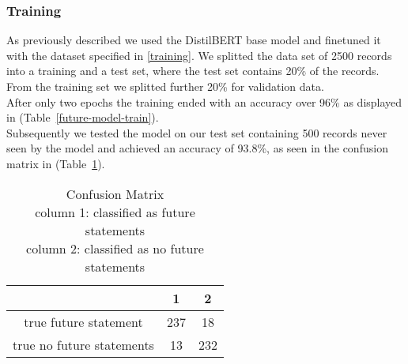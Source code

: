\documentclass[11pt]{article}
\begin{document}
\subsubsection{Training}
As previously described we used the DistilBERT base model and finetuned it with the dataset specified in \ref{training}.
We splitted the data set of 2500 records into a training and a test set, where the test set contains 20\% of the records. From the training set we splitted further 20\% for validation data.\\
After only two epochs the training ended with an accuracy over 96\% as displayed in (Table~\ref{future-model-train}).\\
Subsequently we tested the model on our test set containing 500 records never seen by the model and achieved an accuracy of 93.8\%, as seen in the confusion matrix in (Table~\ref{cm}).


\begin{table}
\setlength\tabcolsep{2pt} %
\footnotesize\centering
\captionsetup{size=footnotesize}
\resizebox{\columnwidth}{!}{%
\begin{tabular}{
    ccccc}

\hline

\textbf{Epoch} & \textbf{Train Loss} & \textbf{Train Accuracy} & \textbf{Val. Loss} & \textbf{Val. Accuracy}\\
\hline
0 & 0.3816 & 0.8594 & 0.1547 & 0.9475 \\
1 & 0.1142 & 0.9613 & 0.1272 & 0.9625 \\
\hline
\end{tabular}}
\caption{\label{future-model-train}
Training Results
}
\end{table}

\begin{table}
\small
\captionsetup{size=footnotesize}
\begin{tabular}{
    c|cc}
\hline
& 1 & 2\\
\hline
true future statement & 237 & 18 \\
true no future statements & 13 & 232 \\
\hline
\end{tabular}
\caption{\label{cm}
Confusion Matrix\\
column 1: classified as future statements\\
column 2: classified as no future statements
}
\end{table}
\end{document}
